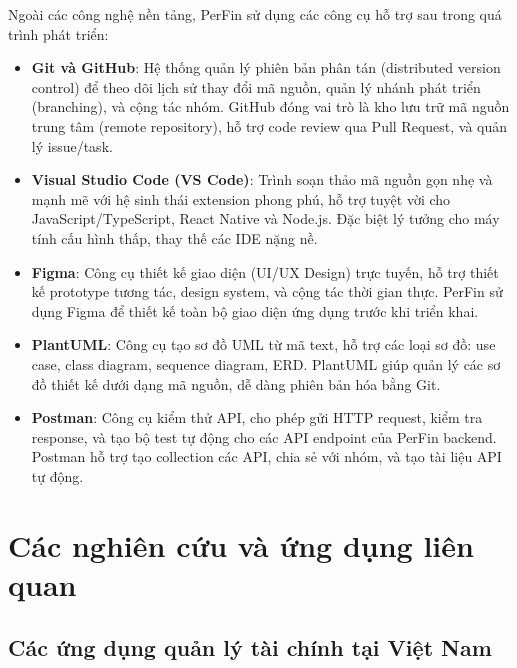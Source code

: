 Ngoài các công nghệ nền tảng, PerFin sử dụng các công cụ hỗ trợ sau trong quá trình phát triển:

\begin{itemize}
    \item \textbf{Git và GitHub}: Hệ thống quản lý phiên bản phân tán (distributed version control) để theo dõi lịch sử thay đổi mã nguồn, quản lý nhánh phát triển (branching), và cộng tác nhóm. GitHub đóng vai trò là kho lưu trữ mã nguồn trung tâm (remote repository), hỗ trợ code review qua Pull Request, và quản lý issue/task.

    \item \textbf{Visual Studio Code (VS Code)}: Trình soạn thảo mã nguồn gọn nhẹ và mạnh mẽ với hệ sinh thái extension phong phú, hỗ trợ tuyệt vời cho JavaScript/TypeScript, React Native và Node.js. Đặc biệt lý tưởng cho máy tính cấu hình thấp, thay thế các IDE nặng nề.

    \item \textbf{Figma}: Công cụ thiết kế giao diện (UI/UX Design) trực tuyến, hỗ trợ thiết kế prototype tương tác, design system, và cộng tác thời gian thực. PerFin sử dụng Figma để thiết kế toàn bộ giao diện ứng dụng trước khi triển khai.

    \item \textbf{PlantUML}: Công cụ tạo sơ đồ UML từ mã text, hỗ trợ các loại sơ đồ: use case, class diagram, sequence diagram, ERD. PlantUML giúp quản lý các sơ đồ thiết kế dưới dạng mã nguồn, dễ dàng phiên bản hóa bằng Git.

    \item \textbf{Postman}: Công cụ kiểm thử API, cho phép gửi HTTP request, kiểm tra response, và tạo bộ test tự động cho các API endpoint của PerFin backend. Postman hỗ trợ tạo collection các API, chia sẻ với nhóm, và tạo tài liệu API tự động.
\end{itemize}

\section{Các nghiên cứu và ứng dụng liên quan}
\label{sec:related_works}

\subsection{Các ứng dụng quản lý tài chính tại Việt Nam}
\label{subsec:vietnam_apps}

